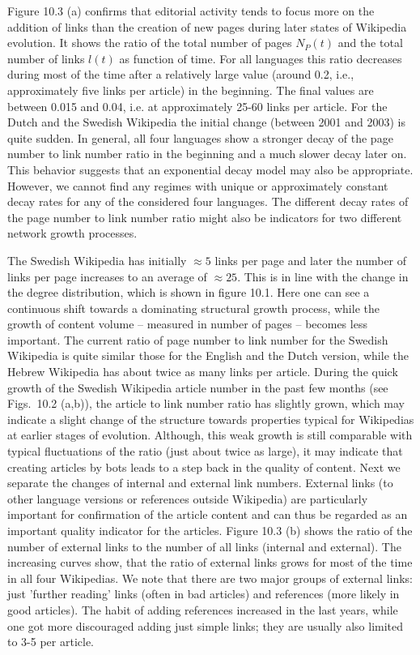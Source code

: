 \documentclass[a4paper,10pt]{scrbook}
\begin{document}
%
%
%
\label{ext.fig.Figure17REPSV} 


Figure 10.3 (a) confirms that editorial activity tends to focus more on the addition of links than
the creation of new pages during later states of Wikipedia evolution.  It shows the ratio of 
the total number of pages $N_P(t)$ and the total number of links $l(t)$ as function of time. 
For all languages this ratio decreases during most of the time after a relatively large value
(around 0.2, i.e., approximately five links per article) in the beginning.  The final values
are between 0.015 and 0.04, i.e. at approximately 25-60 links per article.  For the Dutch and 
the Swedish Wikipedia the initial change (between 2001 and 2003) is quite sudden.  In general,
all four languages show a stronger decay of the page number to link number ratio in the beginning 
and a much slower decay later on.  This behavior suggests that an exponential decay model may 
also be appropriate.  However, we cannot find any regimes with unique or approximately constant 
decay rates for any of the considered four languages.  The different decay rates of the page 
number to link number ratio might also be indicators for two different network growth processes.

The Swedish Wikipedia has initially $\approx 5$ links per page and later the number of links 
per page increases to an average of $\approx 25$.  This is in line with the change in the 
degree distribution, which is shown in figure 10.1.  Here one can see a continuous shift 
towards a dominating structural growth process, while the growth of content volume -- measured 
in number of pages -- becomes less important.  The current ratio of page number to link number
for the Swedish Wikipedia is quite similar those for the English and the Dutch version, while 
the Hebrew Wikipedia has about twice as many links per article.  During the quick growth of the 
Swedish Wikipedia article number in the past few months (see Figs.~10.2 (a,b)), the article to link 
number ratio has slightly grown, which may indicate a slight change of the structure towards 
properties typical for Wikipedias at earlier stages of evolution.  Although, this weak growth 
is still comparable with typical fluctuations of the ratio (just about twice as large), it may
indicate that creating articles by bots leads to a step back in the quality of content. Next we separate the changes of internal and external link numbers.  External links (to other
language versions or references outside Wikipedia) are particularly important for confirmation 
of the article content and can thus be regarded as an important quality indicator for the 
articles. Figure 10.3 (b) shows the ratio of the number of external links to the number of all
links (internal and external). The increasing curves show, that the ratio of external 
links grows for most of the time in all four Wikipedias. We note that there are two major 
groups of external links: just 'further reading' links (often in bad articles) and references 
(more likely in good articles). The habit of adding references increased in the last years, 
while one got more discouraged adding just simple links; they are usually also limited to 
3-5 per article.
\end{document}
